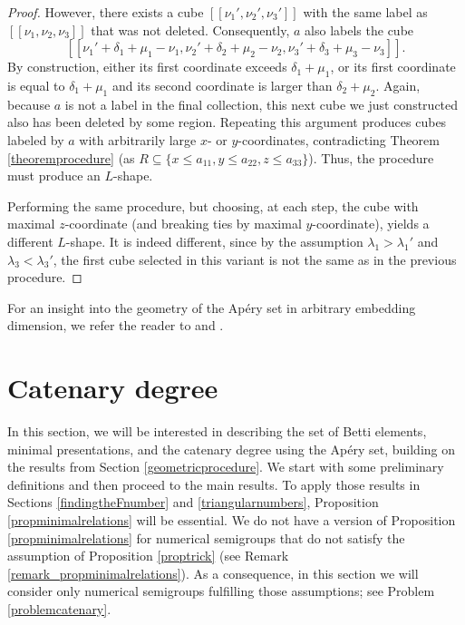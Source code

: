 \documentclass[12pt]{article}
\theoremstyle{remark}
\begin{document}
\begin{proof}
    However, there exists a cube $[[\nu_1',\nu_2',\nu_3']]$ with the same label as $[[\nu_1,\nu_2,\nu_3]]$ that was not deleted. Consequently, $a$ also labels the cube 
    $$[[\nu_1' + \delta_1+\mu_1 -\nu_1,\nu_2' + \delta_2+\mu_2 -\nu_2,\nu_3' + \delta_3+\mu_3 -\nu_3]].$$ 
    By construction, either its first coordinate exceeds $\delta_1+\mu_1$, or its first coordinate is equal to $\delta_1+\mu_1$ and its second coordinate is larger than $\delta_2+\mu_2$. Again, because $a$ is not a label in the final collection, this next cube we just constructed also has been deleted by some region. Repeating this argument produces cubes labeled by $a$ with arbitrarily large $x$- or $y$-coordinates, contradicting Theorem \ref{theoremprocedure} (as $R \subseteq \{x \leq a_{11}, y \leq a_{22}, z \leq a_{33}\}$). Thus, the procedure must produce an $L$-shape.

    
    Performing the same procedure, but choosing, at each step, the cube with maximal $z$-coordinate (and breaking ties by maximal $y$-coordinate), yields a different $L$-shape. It is indeed different, since by the assumption $\lambda_1 > \lambda_1'$ and $\lambda_3 < \lambda_3'$, the first cube selected in this variant is not the same as in the previous procedure.
\end{proof}

For an insight into the geometry of the Ap{\'e}ry set in arbitrary embedding dimension, we refer the reader to \cite{Aicardi2009} and \cite{Kannan1992}.




\section{Catenary degree}\label{bettielements}


In this section, we will be interested in describing the set of Betti elements, minimal presentations, and the catenary degree using the Ap{\'e}ry set, building on the results from Section \ref{geometricprocedure}. We start with some preliminary definitions and then proceed to the main results. To apply those results in Sections \ref{findingtheFnumber} and \ref{triangularnumbers}, Proposition \ref{propminimalrelations} will be essential. We do not have a version of Proposition \ref{propminimalrelations} for numerical semigroups that do not satisfy the assumption of Proposition \ref{proptrick} (see Remark \ref{remark_propminimalrelations}). As a consequence, in this section we will consider only numerical semigroups fulfilling those assumptions; see Problem \ref{problemcatenary}. 
\end{document}
